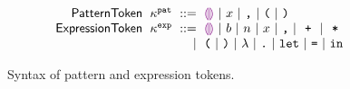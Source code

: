 \begin{figure}
  \vspace{-3px}
  \[
  \arraycolsep=3pt\begin{array}{rlrl}
      \mathsf{PatternToken} & \kappa^{\pat} & ::= &
        \shole ~\vert~
        \svar{x} ~\vert~
        \sprod{}{} ~\vert~
        \texttt{(} ~\vert~
        \texttt{)} \\
      \mathsf{ExpressionToken} & \kappa^{\expr} & ::= &
        \shole ~\vert~
        \sboollit{b} ~\vert~
        \snumlit{n} ~\vert~
        \svar{x} ~\vert~
        \sprod{}{} ~\vert~
        \splus{}{} ~\vert~
        \smult{}{} \\
      & & \vert &
        \texttt{(} ~\vert~
        \texttt{)} ~\vert~
        \lambda ~\vert~
        \texttt{.} ~\vert~
        \texttt{let} ~\vert~
        \texttt{=} ~\vert~
        \texttt{in}
  \end{array}\]
  \caption{
    Syntax of pattern and expression tokens.
  }
  \label{fig:token-syntax}
\end{figure}